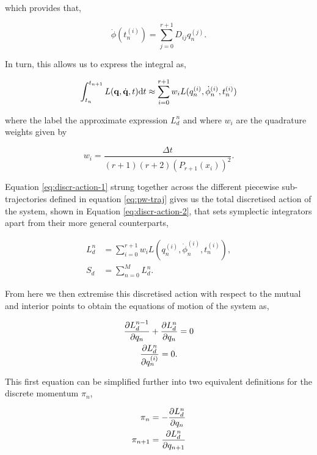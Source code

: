 which provides that,

\begin{equation}
  \dot\phi(t_n^{(i)}) = \sum_{j = 0}^{r + 1} D_{ij}q_n^{(j)}.
\end{equation}

In turn, this allows us to express the integral as,

\begin{equation}
\label{eq:discr-action-1}
  \int_{t_n}^{t_{n + 1}} L(\vb q, \dot{\vb q}, t) \dd t \approx \sum_{i = 0}^{r + 1} w_i L(q_{n}^{(i)}, \dot\phi_{n}^{(i)}, t_{n}^{(i)})
\end{equation}

where the label the approximate expression $L_d^n$ and where $w_i$ are the quadrature weights given by

\begin{equation}
  w_i = \frac{\Delta t}{(r + 1)(r + 2)(P_{r + 1}(x_i))^2}.
\end{equation}

Equation \eqref{eq:discr-action-1} strung together across the different piecewise sub-trajectories defined in equation \eqref{eq:pw-traj} gives us the total discretised action of the system, shown in Equation \eqref{eq:discr-action-2}, that sets symplectic integrators apart from their more general counterparts,

\begin{align}
\label{eq:ldn}
L_d^n &= \sum_{i = 0}^{r + 1} w_i L(q_{n}^{(i)}, \dot\phi_{n}^{(i)}, t_{n}^{(i)}), \\
\label{eq:discr-action-2}
  S_d &= \sum_{n = 0}^{M} L_d^n.
\end{align}

From here we then extremise this discretised action with respect to the mutual and interior points to obtain the equations of motion of the system as,

\begin{gather}
	\frac{\partial L_d^{n-1}}{\partial q_n} + \frac{\partial L_d^{n}}{\partial q_n} = 0 \\
	\label{eq:Ld-interior-eom} \frac{\partial L_d^{n}}{\partial q^{(i)}_n} = 0.
\end{gather}

This first equation can be simplified further into two equivalent definitions for the discrete momentum \(\pi_n\),

\begin{align}
	\label{eq:pi-n} \pi_n &= -\frac{\partial L_d^{n}}{\partial q_n} \\
	\label{eq:pi-n+1} \pi_{n + 1} &= \frac{\partial L_d^{n}}{\partial q_{n + 1}}
\end{align}

